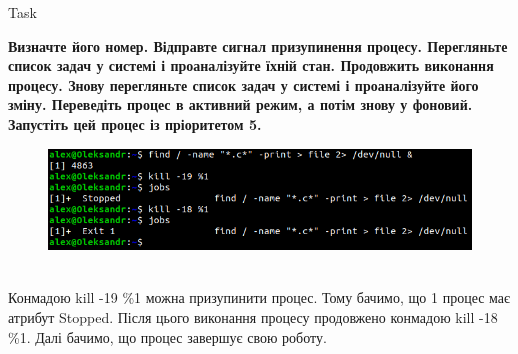 \documentclass[a4paper,12pt]{article}
\newcommand{\RomanNumeralCaps}[1]{\MakeUppercase{\romannumeral #1}}
\begin{document}
    \begin{center}
        \Large{Task \RomanNumeralCaps{6}}
    \end{center}
    \textbf{Визначте його номер. Відправте сигнал призупинення процесу. Перегляньте список задач у системі і
    проаналізуйте їхній стан. Продовжить виконання процесу. Знову перегляньте список задач у системі і проаналізуйте 
    його зміну. Переведіть процес в активний режим, а потім знову у фоновий. Запустіть цей процес із пріоритетом 5.}
    \begin{figure}[h!]
        \begin{minipage}[h]{1\linewidth}
            \centering
            \includegraphics[width=0.6\linewidth]{Prt sc/Figure_6_1.png}  
        \end{minipage}
    \end{figure} \\
    Конмадою kill -19 \%1 можна призупинити процес. Тому бачимо, що 1 процес має атрибут Stopped.
    Після цього виконання процесу продовжено конмадою kill -18 \%1.
    Далі бачимо, що процес завершує свою роботу.
\end{document}

